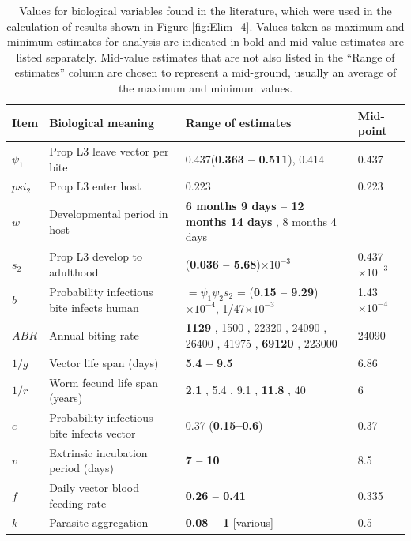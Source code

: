 \begin{table}
    \centering
\begin{tabular}{|l|p{70mm}|p{95mm}|l|}
    \hline
    \multicolumn{1}{|l|}{\bf Item} & \multicolumn{1}{|l|}{\bf Biological meaning} &
\multicolumn{1}{|l|}{\bf Range of estimates} &
\multicolumn{1}{|l|}{\bf Mid-point} \\ \hline
        $\psi_1$ & Prop L3 leave vector per bite & 0.437(\textbf{0.363 -- 0.511})\cite{deMeillon1997}, 0.414 \cite{deMeillon1997} & 0.437  \\
        $psi_2$ & Prop L3 enter host & 0.223 \cite{Norman2000_epifil,Ewert1967} & 0.223 \\
        $w$ & Developmental period in host & \textbf{6 months 9 days -- 12 months 14 days} \cite{Addiss2000}, 8 months 4 days \cite{Hairston1968} & \\
        $s_2$ & Prop L3 develop to adulthood & (\textbf{0.036 -- 5.68})$\times 10^{-3}$ \cite{Hairston1968,gambhir2008,erickson2009,Jones2014} & 0.437$\times 10^{-3}$ \\
        $b$ & Probability infectious bite infects human & $=\psi_1\psi_2 s_2$ = (\textbf{0.15 -- 9.29})$\times 10^{-4}$, 1/47$\times 10^{-3}$ \cite{Hairston1968,Jones2014} & 1.43$\times 10^{-4}$ \\
        $ABR$ & Annual biting rate & \textbf{1129} \cite{Killeen2000}, 1500 \cite{Michael2016}, 22320 \cite{Braack2015}, 24090 \cite{Killeen2000}, 26400 \cite{Stolk2005}, 41975 \cite{Braack2015}, \textbf{69120} \cite{Stolk2005}, 223000 \cite{Michael2016} & 24090 \\
        $1/g$ & Vector life span (days) & \textbf{5.4 -- 9.5} \cite{Killeen2000,Subramanian1998} & 6.86 \\
        $1/r$ & Worm fecund life span (years) & \textbf{2.1} \cite{Vanamail1996}, 5.4 \cite{Vanamail1996}, 9.1 \cite{Subramanian2004}, \textbf{11.8} \cite{Subramanian2004}, 40 \cite{Carme1979} & 6 \\
        $c$ & Probability infectious bite infects vector & 0.37 \cite{gambhir2008} (\textbf{0.15--0.6}) \cite{Subramanian1998} & 0.37 \\
        $v$ & Extrinsic incubation period (days) & \textbf{7 -- 10} \cite{erickson2009} & 8.5 \\
        $f$ & Daily vector blood feeding rate & \textbf{0.26 -- 0.41} \cite{Subramanian1998} & 0.335 \\
        $k$ & Parasite aggregation & \textbf{0.08 -- 1} [various] & 0.5 \\
        \hline
    \end{tabular}
    \caption[Biological parameter ranges from the literature.]{Values for biological variables found in the literature, which were used in the calculation of results shown in Figure \ref{fig:Elim_4}. Values taken as maximum and minimum estimates for analysis are indicated in bold and mid-value estimates are listed separately. Mid-value estimates that are not also listed in the “Range of estimates” column are chosen to represent a mid-ground, usually an average of the maximum and minimum values.}
    \label{tab:Elim}
\end{table}

